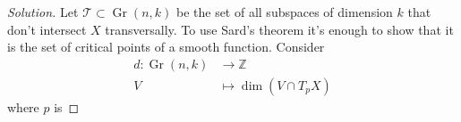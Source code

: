 \begin{proof}[Solution]\leavevmode
Let \(\mathcal{T}\subset \operatorname{Gr}(n,k)\) be the set of all subspaces of dimension \(k\) that don't intersect \(X\) transversally. To use Sard's theorem it's enough to show that it is the set of critical points of a smooth function. Consider
\begin{align*}
	d: \operatorname{Gr}(n,k) &\longrightarrow \mathbb{Z} \\
	V &\longmapsto \dim (V \cap T_pX)
\end{align*}
where \(p\) is 
\end{proof}






